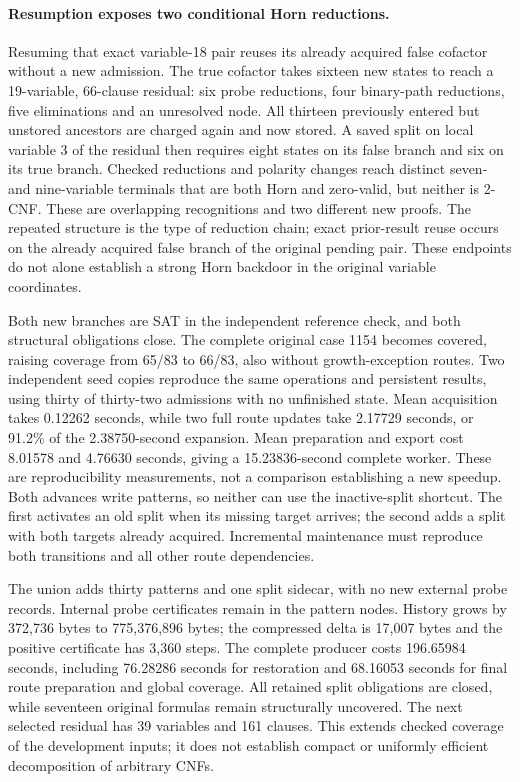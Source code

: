 \documentclass[11pt,a4paper]{article}
\numberwithin{equation}{section}
\theoremstyle{plain}
\theoremstyle{definition}
\theoremstyle{remark}
\begin{document}
\paragraph{Resumption exposes two conditional Horn reductions.}
Resuming that exact variable-18 pair reuses its already acquired false cofactor without a new admission. The true cofactor takes sixteen new states to reach a 19-variable, 66-clause residual: six probe reductions, four binary-path reductions, five eliminations and an unresolved node. All thirteen previously entered but unstored ancestors are charged again and now stored. A saved split on local variable 3 of the residual then requires eight states on its false branch and six on its true branch. Checked reductions and polarity changes reach distinct seven- and nine-variable terminals that are both Horn and zero-valid, but neither is 2-CNF. These are overlapping recognitions and two different new proofs. The repeated structure is the type of reduction chain; exact prior-result reuse occurs on the already acquired false branch of the original pending pair. These endpoints do not alone establish a strong Horn backdoor in the original variable coordinates.

Both new branches are SAT in the independent reference check, and both structural obligations close. The complete original case 1154 becomes covered, raising coverage from 65/83 to 66/83, also without growth-exception routes. Two independent seed copies reproduce the same operations and persistent results, using thirty of thirty-two admissions with no unfinished state. Mean acquisition takes 0.12262 seconds, while two full route updates take 2.17729 seconds, or 91.2\% of the 2.38750-second expansion. Mean preparation and export cost 8.01578 and 4.76630 seconds, giving a 15.23836-second complete worker. These are reproducibility measurements, not a comparison establishing a new speedup. Both advances write patterns, so neither can use the inactive-split shortcut. The first activates an old split when its missing target arrives; the second adds a split with both targets already acquired. Incremental maintenance must reproduce both transitions and all other route dependencies.

The union adds thirty patterns and one split sidecar, with no new external probe records. Internal probe certificates remain in the pattern nodes. History grows by 372,736 bytes to 775,376,896 bytes; the compressed delta is 17,007 bytes and the positive certificate has 3,360 steps. The complete producer costs 196.65984 seconds, including 76.28286 seconds for restoration and 68.16053 seconds for final route preparation and global coverage. All retained split obligations are closed, while seventeen original formulas remain structurally uncovered. The next selected residual has 39 variables and 161 clauses. This extends checked coverage of the development inputs; it does not establish compact or uniformly efficient decomposition of arbitrary CNFs.
\end{document}
